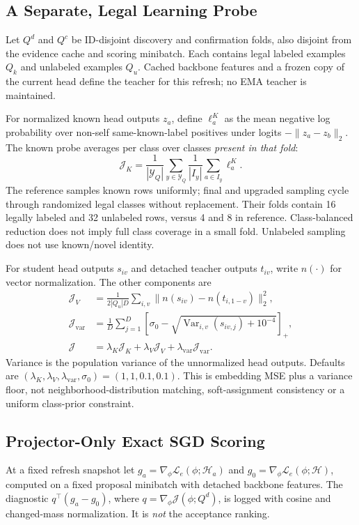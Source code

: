 \documentclass[conference]{IEEEtran}
\newcommand{\Lcal}{\mathcal L}
\newcommand{\Jcal}{\mathcal J}
\begin{document}
\subsection{A Separate, Legal Learning Probe}
Let $Q^d$ and $Q^c$ be ID-disjoint discovery and confirmation folds, also disjoint from the evidence cache and scoring minibatch. Each contains legal labeled examples $Q_k$ and unlabeled examples $Q_u$. Cached backbone features and a frozen copy of the current head define the teacher for this refresh; no EMA teacher is maintained.

For normalized known head outputs $z_a$, define $\ell_a^K$ as the mean negative log probability over non-self same-known-label positives under logits $-\|z_a-z_b\|_2$. The known probe averages per class over classes \emph{present in that fold}:
\begin{equation}
\Jcal_K=\frac1{|\mathcal Y_Q|}\sum_{y\in\mathcal Y_Q}
\frac1{|I_y|}\sum_{a\in I_y}\ell_a^K.
\end{equation}
The reference samples known rows uniformly; final and upgraded sampling cycle through randomized legal classes without replacement. Their folds contain 16 legally labeled and 32 unlabeled rows, versus 4 and 8 in reference. Class-balanced reduction does not imply full class coverage in a small fold. Unlabeled sampling does not use known/novel identity.

For student head outputs $s_{iv}$ and detached teacher outputs $t_{iv}$, write $n(\cdot)$ for vector normalization. The other components are
\begin{align}
\Jcal_V&=\frac1{2|Q_u|D}\sum_{i,v}\|n(s_{iv})-n(t_{i,1-v})\|_2^2,\\
\Jcal_{\mathrm{var}}&=\frac1D\sum_{j=1}^D
\left[\sigma_0-\sqrt{\operatorname{Var}_{i,v}(s_{iv,j})+10^{-4}}\right]_+,\\
\Jcal&=\lambda_K\Jcal_K+\lambda_V\Jcal_V+
\lambda_{\mathrm{var}}\Jcal_{\mathrm{var}}.
\end{align}
Variance is the population variance of the unnormalized head outputs. Defaults are $(\lambda_K,\lambda_V,\lambda_{\mathrm{var}},\sigma_0)=(1,1,0.1,0.1)$. This is embedding MSE plus a variance floor, not neighborhood-distribution matching, soft-assignment consistency or a uniform class-prior constraint.

\subsection{Projector-Only Exact SGD Scoring}
At a fixed refresh snapshot let $g_a=\nabla_\phi\Lcal_e(\phi;\mathcal H_a)$ and $g_0=\nabla_\phi\Lcal_e(\phi;\mathcal H)$, computed on a fixed proposal minibatch with detached backbone features. The diagnostic $q^\top(g_a-g_0)$, where $q=\nabla_\phi\Jcal(\phi;Q^d)$, is logged with cosine and changed-mass normalization. It is \emph{not} the acceptance ranking.
\end{document}
